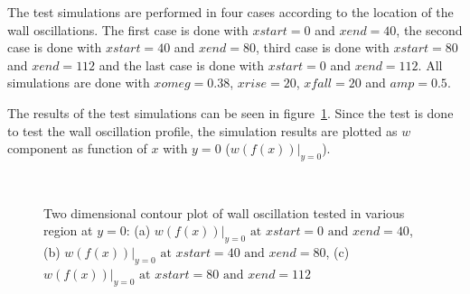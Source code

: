 The test simulations are performed in four cases according to the location of the wall oscillations. The first case is done with $xstart = 0$ and $xend = 40$, the second case is done with $xstart=40$ and $xend=80$, third case is done with $xstart=80$ and $xend = 112$ and the last case is done with $xstart = 0$ and $xend = 112$. All simulations are done with $xomeg = 0.38$, $xrise=20$, $xfall=20$ and $amp=0.5$.

The results of the test simulations can be seen in figure~\ref{fig:w(f(x))-test}. Since the test is done to test the wall oscillation profile, the simulation results are plotted as $w$ component as function of $x$ with $y=0$ ($w(f(x))|_{y=0}$).

\begin{figure}[!h]
  \centering
   \\
  \caption{Two dimensional contour plot of wall oscillation tested in various region at $y=0$: (a) $w(f(x))|_{y=0} \mbox{ at } xstart = 0 \mbox{ and } xend = 40$, (b) $w(f(x))|_{y=0} \mbox{ at } xstart = 40 \mbox{ and } xend = 80$, (c) $w(f(x))|_{y=0} \mbox{ at } xstart = 80 \mbox{ and } xend = 112$}
  \label{fig:w(f(x))-test}
\end{figure}


